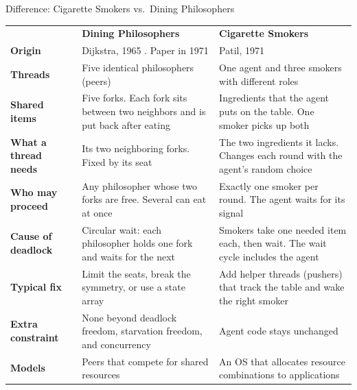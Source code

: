 \documentclass[aspectratio=169,10pt,xcolor=table]{beamer}
\begin{document}
\begin{frame}{Difference: Cigarette Smokers vs.\ Dining Philosophers}
    \footnotesize
    \renewcommand{\arraystretch}{1.15}
    \begin{tabular}{@{}>{\raggedright\bfseries}p{} >{\raggedright\arraybackslash}p{} >{\raggedright\arraybackslash}p{}@{}}
        \rowcolor{gray!15}
        & \textcolor{dp}{\textbf{Dining Philosophers}} & \textcolor{cs}{\textbf{Cigarette Smokers}} \\
        Origin & Dijkstra, 1965 \cite{downey}. Paper in 1971 \cite{dijkstra} & Patil, 1971 \cite{patil,downey} \\
        Threads & Five identical philosophers (peers) & One agent and three smokers with different roles \\
        Shared items & Five forks. Each fork sits between two neighbors and is put back after eating & Ingredients that the agent puts on the table. One smoker picks up both \\
        What a thread needs & Its two neighboring forks. Fixed by its seat & The two ingredients it lacks. Changes each round with the agent's random choice \\
        Who may proceed & Any philosopher whose two forks are free. Several can eat at once & Exactly one smoker per round. The agent waits for its signal \\
        Cause of deadlock & Circular wait: each philosopher holds one fork and waits for the next & Smokers take one needed item each, then wait. The wait cycle includes the agent \\
        Typical fix & Limit the seats, break the symmetry, or use a state array \cite{downey,tanenbaum} & Add helper threads (pushers) that track the table and wake the right smoker \cite{parnas,downey} \\
        Extra constraint & None beyond deadlock freedom, starvation freedom, and concurrency & Agent code stays unchanged \cite{downey} \\
        Models & Peers that compete for shared resources & An OS that allocates resource combinations to applications \cite{downey} \\
    \end{tabular}
\end{frame}
\end{document}
